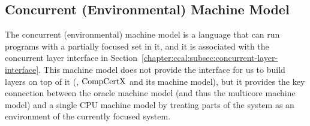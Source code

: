 

\subsection{Concurrent (Environmental) Machine Model}
\label{chapter:linking:subsec:concurrent-machine-model}

The concurrent (environmental) machine model is a language that can run programs with a partially focused set in it,
and it is associated with the concurrent layer interface in Section~\ref{chapter:ccal:subsec:concurrent-layer-interface}. 
This machine model does not provide the interface for us to build layers on top of it (\eg, $\mathrm{CompCertX}$ and its machine model), but it provides the key connection between the oracle machine model (and thus the multicore machine model) and a single CPU machine model
by treating parts of the system as an environment of the currently focused system. 

